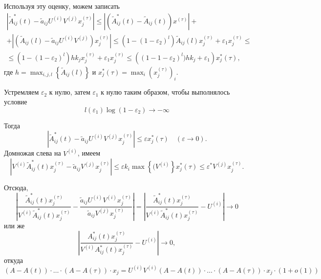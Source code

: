 \documentclass[12pt]{article}
\renewcommand{\leq}{\leqslant}
\renewcommand{\epsilon}{\varepsilon}
\begin{document}
{Используя эту оценку, можем записать
\begin{multline}
	\left| \tilde{A}^*_{ij}(t) - \tilde{a}_{ij} U^{(i)} V^{(j)} x^{(\tau)}_j \right| \leq \left| \left( \tilde{A}^*_{ij}(t) - \tilde{A}_{ij}(t) \right) x^{(\tau)} \right| + \\
	+ \left| \left( \tilde{A}_{ij}(l) - \tilde{a}_{ij} U^{(i)} V^{(j)} \right) x^{(\tau)}_j \right| \leq (1 - (1 - \epsilon_2)^l) \tilde{A}_{ij}(l) x^{(\tau)}_j + \epsilon_1 x^{(\tau)}_j \leq \\
	\leq (1 - (1 - \epsilon_2)^l) h k_j x^{(\tau)}_j + \epsilon_1 x^{(\tau)}_j \leq \left( (1 - 1 - \epsilon_2)^l) h k_j + \epsilon_1 \right) x^*_j(\tau),
\end{multline}
где $h = \max_{i,j,l} \left\{ \tilde{A}_{ij}(l) \right\}$ и $x^*_j(\tau) = \max_i (x^{(\tau)}_j)_i$.

Устремляем $\epsilon_2$ к нулю, затем $\epsilon_1$ к нулю таким образом, чтобы выполнялось условие
\begin{equation}
	l(\epsilon_1) \log(1 - \epsilon_2) \rightarrow -\infty
\end{equation}

Тогда 
\begin{equation}
	\left| \tilde{A}^*_{ij}(t) - \tilde{a}_{ij} U^{(i)} V^{(j)} x^{(\tau)}_j \right| \leq \epsilon x^*_j(\tau)\quad (\epsilon \rightarrow 0).
\end{equation}
Домножая слева на $V^{(i)}$, имеем
\begin{equation}
	\left| V^{(i)} \tilde{A}^*_{ij}(t) x^{(\tau)}_j - \tilde{a}_{ij} V^{(j)} x^{(\tau)}_j \right| \leq \epsilon k_i \max \left\{ (V^{(i)} \right\} x^*_j(\tau) \leq \epsilon^* V^{(j)} x^{(\tau)}_j.
\end{equation}

Отсюда,
\begin{equation}
	\left| \frac{\tilde{A}^*_{ij}(t) x^{(\tau)}_j}{V^{(i)} \tilde{A}^*_{ij}(t) x^{(\tau)}_j} - \frac{\tilde{a}_{ij} U^{(i)} V^{(i)} x^{(\tau)}_j}{\tilde{a}_{ij} V^{(j)} x^{(\tau)}_j} \right| = \left| \frac{\tilde{A}^*_{ij}(t) x^{(\tau)}_j}{V^{(i)} \tilde{A}^*_{ij}(t) x^{(\tau)}_j} - U^{(i)} \right| \rightarrow 0
\end{equation}
или же
\begin{equation}
	\left| \frac{A^*_{ij}(t) x^{(\tau)}_j}{V^{(i)} A^*_{ij}(t) x^{(\tau)}_j} - U^{(i)} \right| \rightarrow 0,
\end{equation}
откуда
\begin{equation}
	(A - A(t)) \cdot \ldots \cdot (A - A(\tau)) \cdot x_j = U^{(i)} V^{(i)} (A - A(t)) \cdot \ldots \cdot (A - A(\tau)) \cdot x_j \cdot (1 + o(1))
\end{equation}

}
\end{document}

